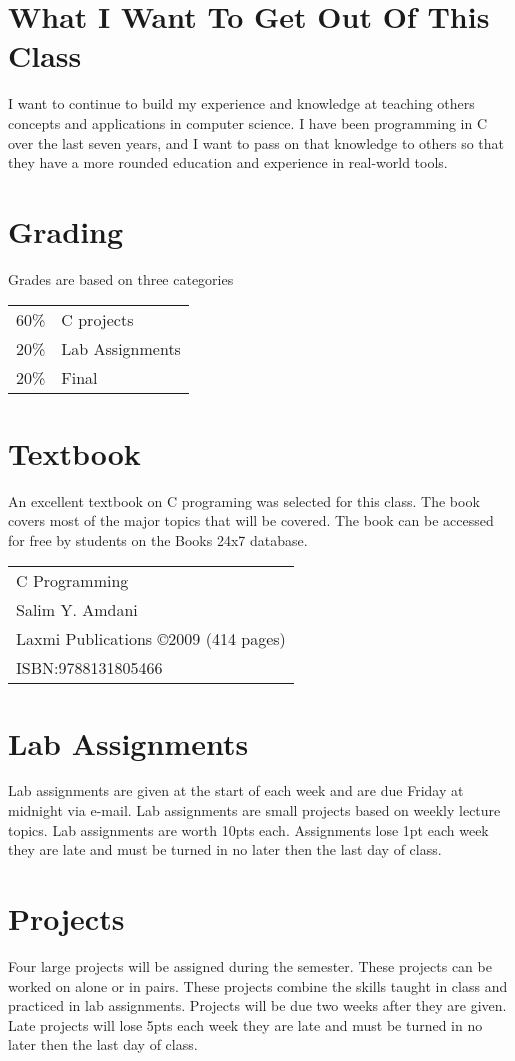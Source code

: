 \documentclass[a4paper,12pt]{report}
\begin{document}
\section*{What I Want To Get Out Of This Class}
I want to continue to build my experience and knowledge at teaching others concepts and applications in computer science.  I have been programming in C over the last seven years, and I want to pass on that knowledge to others so that they have a more rounded education and experience in real-world tools. 


\section*{Grading}
Grades are based on three categories

\begin{tabular}{l l}
60\% & C projects \\
20\% & Lab Assignments \\
20\% & Final 
\end{tabular}

\section*{Textbook}
An excellent textbook on C programing was selected for this class.  The book covers most of the major topics that will be covered.  The book can be accessed for free by students on the Books 24x7 database.

\begin{tabular}{l}
C Programming \\
Salim Y. Amdani \\
Laxmi Publications \copyright 2009 (414 pages) \\
ISBN:9788131805466 \\
\end{tabular}

\section*{Lab Assignments}
Lab assignments are given at the start of each week and are due Friday at midnight via e-mail.  Lab assignments are small projects based on weekly lecture topics.  Lab assignments are worth 10pts each.  Assignments lose 1pt each week they are late and must be turned in no later then the last day of class.

\section*{Projects}
Four large projects will be assigned during the semester. These projects can be worked on alone or in pairs.  These projects combine the skills taught in class and practiced in lab assignments.  Projects will be due two weeks after they are given.  Late projects will lose 5pts each week they are late and must be turned in no later then the last day of class.
\end{document}
